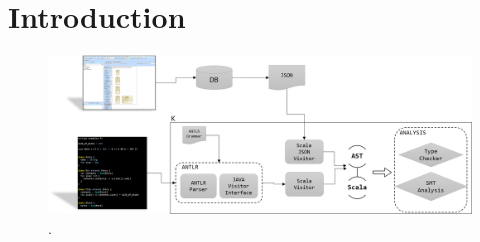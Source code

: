 \section{Introduction}
\label{sec:introduction}

\begin{figure}
\centering
\includegraphics[scale=0.4]{K.png}
\caption{\Klang{}.}
\label{fig:k}
\end{figure}
